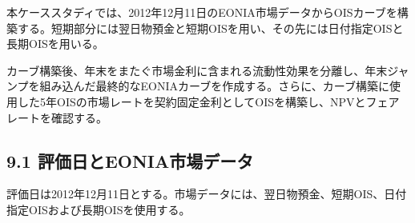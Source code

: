 \documentclass[
  letterpaper,
  DIV=11,
  numbers=noendperiod]{scrreprt}
\begin{document}
本ケーススタディでは、2012年12月11日のEONIA市場データからOISカーブを構築する。短期部分には翌日物預金と短期OISを用い、その先には日付指定OISと長期OISを用いる。

カーブ構築後、年末をまたぐ市場金利に含まれる流動性効果を分離し、年末ジャンプを組み込んだ最終的なEONIAカーブを作成する。さらに、カーブ構築に使用した5年OISの市場レートを契約固定金利としてOISを構築し、NPVとフェアレートを確認する。

\subsection{9.1
評価日とEONIA市場データ}\label{ux8a55ux4fa1ux65e5ux3068eoniaux5e02ux5834ux30c7ux30fcux30bf}

評価日は2012年12月11日とする。市場データには、翌日物預金、短期OIS、日付指定OISおよび長期OISを使用する。
\end{document}
